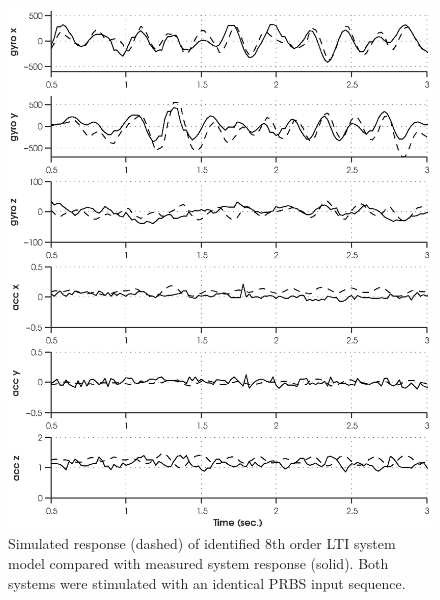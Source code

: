 \newpage
\begin{figure}[htb!]
	\centering
	\includegraphics{../fig/sim_1760_20131017212626_31_38500.eps}
	\caption{Simulated response (dashed) of identified 8th order LTI system model compared with measured system response (solid). Both systems were stimulated with an identical PRBS input sequence.}
	\label{sim_1760_20131017212626_31_38500}
\end{figure}\clearpage

